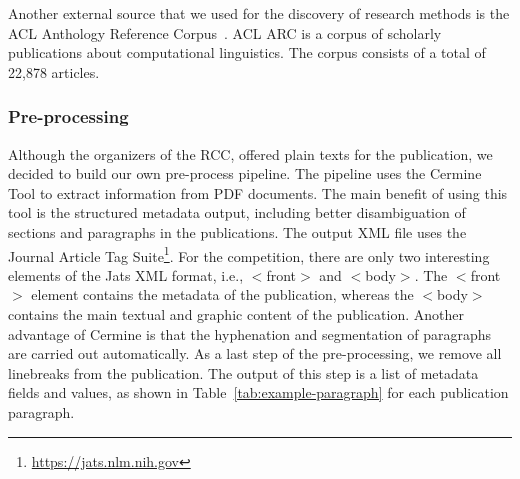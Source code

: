 Another external source that we used for the discovery of research methods is the ACL Anthology Reference Corpus~\cite{bird2008acl}. ACL ARC is a corpus of scholarly publications about computational linguistics.  
The corpus consists of a total of 22,878 articles.




\subsubsection{Pre-processing}
\label{sec:prepro}
Although the organizers of the RCC, offered plain texts for the publication, we decided to build our own pre-process pipeline. The pipeline uses the Cermine Tool to extract information from PDF documents. The main benefit of using this tool is the structured metadata output, including better disambiguation of sections and paragraphs in the publications. The output XML file uses the Journal Article Tag Suite\footnote{\url{https://jats.nlm.nih.gov}}. For the competition, there are only two interesting elements of the Jats XML format, i.e., $<$front$>$ and $<$body$>$. The $<$front$>$ element contains the metadata of the publication, whereas the $<$body$>$ contains the main textual and graphic content of the publication.
Another advantage of Cermine is that the hyphenation and segmentation of paragraphs are carried out automatically. 
As a last step of the pre-processing, we remove all linebreaks from the publication. The output of this step is a list of metadata fields and values, as shown in Table~\ref{tab:example-paragraph} for each publication paragraph.

